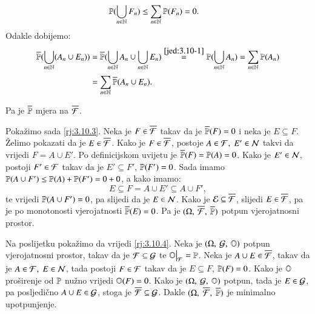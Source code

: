 \begin{rj}
\begin{enumerate}[label=(\roman*)]
\begin{equation}
\begin{aligned}
                \mathbb{P}({\bigcup\limits_{n \in \mathbb{N}}^{} F_n}) &\leq \sum\limits_{n \in \mathbb{N}}^{} \mathbb{P}({F_n}) = 0.
            \end{aligned}
        \end{equation}
        Odakle dobijemo:
        \begin{equation*}
            \begin{aligned}
                \overline{\mathbb{P}} (\bigcup\limits_{n \in \mathbb{N}}^{} (A_n \cup E_n)) &= \overline{\mathbb{P}} (\bigcup\limits_{n \in \mathbb{N}}^{} A_n \cup \bigcup\limits_{n \in \mathbb{N}}^{} E_n) \overset{\eqref{jed:3.10-1}}{=} \mathbb{P}({\bigcup\limits_{n \in \mathbb{N}}^{} A_n}) = \sum\limits_{n \in \mathbb{N}}^{} \mathbb{P}({A_n})\\ &= \sum\limits_{n \in \mathbb{N}}^{} \overline{\mathbb{P}} (A_n \cup E_n).
            \end{aligned}
        \end{equation*}
    \end{enumerate}
    Pa je $\overline{\mathbb{P}}$ mjera na $\overline{\mathcal{F}}$.

    Poka\v zimo sada \ref{rj:3.10.3}.
    Neka je $F \in \overline{\mathcal{F}}$ takav da je $\overline{\mathbb{P}} (F) = 0$ i neka je $E \subseteq F$.
    \v Zelimo pokazati da je $E \in \overline{\mathcal{F}}$.
    Kako je $F \in \overline{\mathcal{F}}$, postoje $A \in \mathcal{F}, \; E' \in \mathcal{N}$ takvi da vrijedi $F = A \cup E'$.
    Po definicijskom uvijetu je $\overline{\mathbb{P}} (F) = \mathbb{P}({A}) = 0$.
    Kako je $E' \in \mathcal{N}$, postoji $F' \in \mathcal{F}$ takav da je $E' \subseteq F'$, $\mathbb{P}({F'}) = 0$.
    Sada imamo $\mathbb{P}({A \cup F'}) \leq \mathbb{P}({A}) + \mathbb{P}({F'}) = 0 + 0$, a kako imamo:
    \begin{equation*}
        E \subseteq F = A \cup E' \subseteq A \cup F',
    \end{equation*}
    te vrijedi $\mathbb{P}({A \cup F'}) = 0$, pa slijedi da je $E \in \mathcal{N}$.
    Kako je $\mathcal{E} \subseteq \overline{\mathcal{F}}$, slijedi $E \in \overline{\mathcal{F}}$, pa je po monotonosti vjerojatnosti $\overline{\mathbb{P}} (E) = 0$.
    Pa je $(\Omega, \: \overline{\mathcal{F}}, \: \overline{\mathbb{P}})$ potpun vjerojatnosni prostor.

    Na poslijetku poka\v zimo da vrijedi \ref{rj:3.10.4}.
    Neka je $(\Omega, \: \mathcal{G}, \: \mathbb{O})$ potpun vjerojatnosni prostor, takav da je $\mathcal{F} \subseteq \mathcal{G}$ te $\restr{\masO}{\famF} = \masP$.
    Neka je $A \cup E \in \overline{\mathcal{F}}$, takav da je $A \in \mathcal{F}, \; E \in \mathcal{N}$, tada postoji $F \in \mathcal{F}$ takav da je $E \subseteq F$, $\mathbb{P}({F}) = 0$.
    Kako je $\mathbb{O}$ pro\v sirenje od $\mathbb{P}$ nu\v zno vrijedi $\mathbb{O} (F) = 0$.
    Kako je $(\Omega, \: \mathcal{G}, \: \mathbb{O})$ potpun, tada je $E \in \mathcal{G}$, pa posljedi\v cno $A \cup E \in \mathcal{G}$, stoga je $\overline{\mathcal{F}} \subseteq \mathcal{G}$.
    Dakle $(\Omega, \; \overline{\mathcal{F}}, \; \overline{\mathbb{P}})$ je minimalno upotpunjenje.
    

\end{rj}
